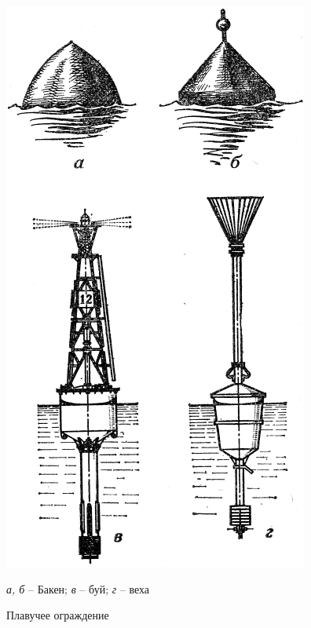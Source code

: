 \documentclass[a4paper, 12pt, twoside, final, book, russian, fittopage, cyremdash]{ncc}
\begin{document}
\begin{figure}[htb]
  \centering{}
  \includegraphics[scale=1.2]{0055P}
  \caption{Плавучее ограждение}
  \label{fig:55}
  \small
  \centering{}
  \textit{а, б} \--- Бакен; \textit{в} \--- буй; \textit{г} \--- веха
\end{figure}
\end{document}
